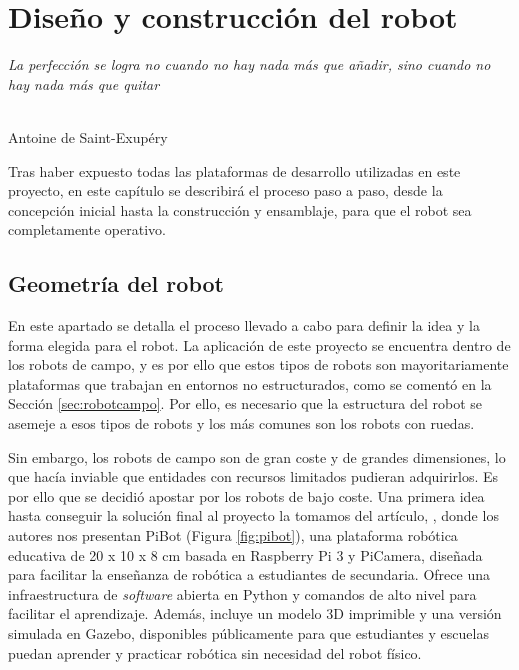 \chapter{Diseño y construcción del robot}
\label{cap:capitulo5}

\begin{flushright}
\begin{minipage}[]{10cm}
\emph{La perfección se logra no cuando no hay nada más que añadir, sino cuando no hay nada más que quitar}\\
\end{minipage}\\

Antoine de Saint-Exupéry\\
\end{flushright}

\vspace{1cm}

Tras haber expuesto todas las plataformas de desarrollo utilizadas en este proyecto, en este capítulo se describirá el proceso paso a paso, desde la concepción inicial hasta la construcción y ensamblaje, para que el robot sea completamente operativo.

\section{Geometría del robot}
\label{sec:geometriarobot}

En este apartado se detalla el proceso llevado a cabo para definir la idea y la forma elegida para el robot. La aplicación de este proyecto se encuentra dentro de los robots de campo, y es por ello que estos tipos de robots son mayoritariamente plataformas que trabajan en entornos no estructurados, como se comentó en la Sección \ref{sec:robotcampo}. Por ello, es necesario que la estructura del robot se asemeje a esos tipos de robots y los más comunes son los robots con ruedas. 

Sin embargo, los robots de campo son de gran coste y de grandes dimensiones, lo que hacía inviable que entidades con recursos limitados pudieran adquirirlos. Es por ello que se decidió apostar por los robots de bajo coste. Una primera idea hasta conseguir la solución final al proyecto la tomamos del artículo, \cite{vega18c}, donde los autores nos presentan PiBot (Figura \ref{fig:pibot}), una plataforma robótica educativa de 20 x 10 x 8 cm basada en Raspberry Pi 3 y PiCamera, diseñada para facilitar la enseñanza de robótica a estudiantes de secundaria. Ofrece una infraestructura de \textit{software} abierta en Python y comandos de alto nivel para facilitar el aprendizaje. Además, incluye un modelo 3D imprimible y una versión simulada en Gazebo, disponibles públicamente para que estudiantes y escuelas puedan aprender y practicar robótica sin necesidad del robot físico. 

